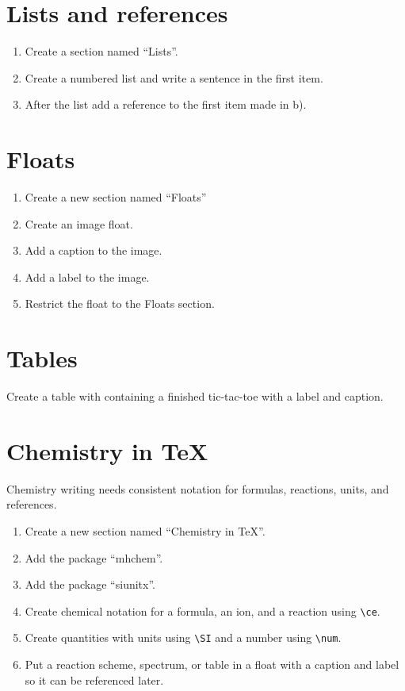 \documentclass{article}
\begin{document}
\section{Lists and references}
\begin{enumerate}[label=\alph*)]
  \item Create a section named ``Lists''.
  \item Create a numbered list and write a sentence in the first item.
  \item After the list add a reference to the first item made in b).
\end{enumerate}

\section{Floats}
\begin{enumerate}[label=\alph*)]
  \item Create a new section named ``Floats''
  \item Create an image float.
  \item Add a caption to the image.
  \item Add a label to the image.
  \item Restrict the float to the Floats section.
\end{enumerate}

\section{Tables}
Create a table with containing a finished tic-tac-toe with a label and caption.

\section{Chemistry in TeX}
Chemistry writing needs consistent notation for formulas, reactions, units, and references.

\begin{enumerate}[label=\alph*)]
  \item Create a new section named ``Chemistry in TeX''.
  \item Add the package ``mhchem''.
  \item Add the package ``siunitx''.
  \item Create chemical notation for a formula, an ion, and a reaction using \verb|\ce|.
  \item Create quantities with units using \verb|\SI| and a number using \verb|\num|.
  \item Put a reaction scheme, spectrum, or table in a float with a caption and label so it can be referenced later.
\end{enumerate}
\end{document}
